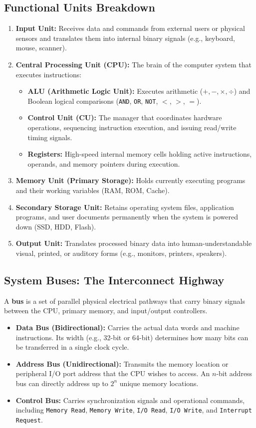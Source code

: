 \subsection{Functional Units Breakdown}
\begin{enumerate}[leftmargin=1.5em]
    \item \textbf{Input Unit:} Receives data and commands from external users or physical sensors and translates them into internal binary signals (e.g., keyboard, mouse, scanner).
    \item \textbf{Central Processing Unit (CPU):} The brain of the computer system that executes instructions:
    \begin{itemize}
        \item \textbf{ALU (Arithmetic Logic Unit):} Executes arithmetic ($+, -, \times, \div$) and Boolean logical comparisons (\texttt{AND}, \texttt{OR}, \texttt{NOT}, $<$, $>$, $=$).
        \item \textbf{Control Unit (CU):} The manager that coordinates hardware operations, sequencing instruction execution, and issuing read/write timing signals.
        \item \textbf{Registers:} High-speed internal memory cells holding active instructions, operands, and memory pointers during execution.
    \end{itemize}
    \item \textbf{Memory Unit (Primary Storage):} Holds currently executing programs and their working variables (RAM, ROM, Cache).
    \item \textbf{Secondary Storage Unit:} Retains operating system files, application programs, and user documents permanently when the system is powered down (SSD, HDD, Flash).
    \item \textbf{Output Unit:} Translates processed binary data into human-understandable visual, printed, or auditory forms (e.g., monitors, printers, speakers).
\end{enumerate}

\subsection{System Buses: The Interconnect Highway}
A \textbf{bus} is a set of parallel physical electrical pathways that carry binary signals between the CPU, primary memory, and input/output controllers.
\begin{itemize}[leftmargin=1.2em]
    \item \textbf{Data Bus (Bidirectional):} Carries the actual data words and machine instructions. Its width (e.g., 32-bit or 64-bit) determines how many bits can be transferred in a single clock cycle.
    \item \textbf{Address Bus (Unidirectional):} Transmits the memory location or peripheral I/O port address that the CPU wishes to access. An $n$-bit address bus can directly address up to $2^n$ unique memory locations.
    \item \textbf{Control Bus:} Carries synchronization signals and operational commands, including \texttt{Memory Read}, \texttt{Memory Write}, \texttt{I/O Read}, \texttt{I/O Write}, and \texttt{Interrupt Request}.
\end{itemize}

